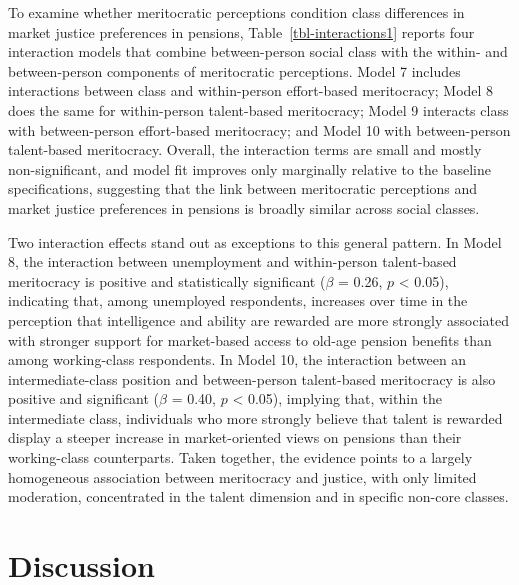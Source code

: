 \documentclass[
  12pt,
]{article}
\begin{document}
To examine whether meritocratic perceptions condition class differences
in market justice preferences in pensions, Table~\ref{tbl-interactions1}
reports four interaction models that combine between-person social class
with the within- and between-person components of meritocratic
perceptions. Model 7 includes interactions between class and
within-person effort-based meritocracy; Model 8 does the same for
within-person talent-based meritocracy; Model 9 interacts class with
between-person effort-based meritocracy; and Model 10 with
between-person talent-based meritocracy. Overall, the interaction terms
are small and mostly non-significant, and model fit improves only
marginally relative to the baseline specifications, suggesting that the
link between meritocratic perceptions and market justice preferences in
pensions is broadly similar across social classes.

Two interaction effects stand out as exceptions to this general pattern.
In Model 8, the interaction between unemployment and within-person
talent-based meritocracy is positive and statistically significant
(\(\beta\) = 0.26, \(p\) \textless{} 0.05), indicating that, among
unemployed respondents, increases over time in the perception that
intelligence and ability are rewarded are more strongly associated with
stronger support for market-based access to old-age pension benefits
than among working-class respondents. In Model 10, the interaction
between an intermediate-class position and between-person talent-based
meritocracy is also positive and significant (\(\beta\) = 0.40, \(p\)
\textless{} 0.05), implying that, within the intermediate class,
individuals who more strongly believe that talent is rewarded display a
steeper increase in market-oriented views on pensions than their
working-class counterparts. Taken together, the evidence points to a
largely homogeneous association between meritocracy and justice, with
only limited moderation, concentrated in the talent dimension and in
specific non-core classes.

\section{Discussion}\label{discussion}
\end{document}
